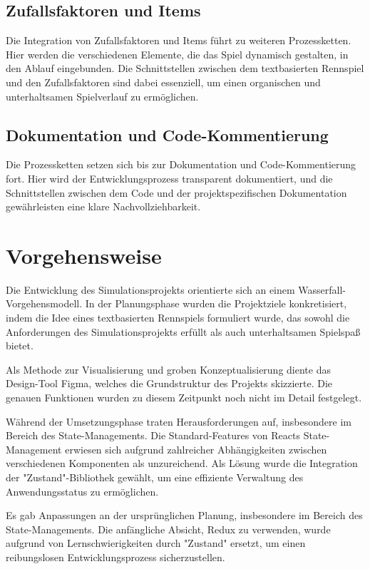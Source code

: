 \documentclass[hidelinks,12pt]{article}
\begin{document}
\subsection{Zufallsfaktoren und Items}
Die Integration von Zufallsfaktoren und Items führt zu weiteren Prozessketten. Hier werden die verschiedenen Elemente, die das Spiel dynamisch gestalten, in den Ablauf eingebunden. Die Schnittstellen zwischen dem textbasierten Rennspiel und den Zufallsfaktoren sind dabei essenziell, um einen organischen und unterhaltsamen Spielverlauf zu ermöglichen.

\subsection{Dokumentation und Code-Kommentierung}
Die Prozessketten setzen sich bis zur Dokumentation und Code-Kommentierung fort. Hier wird der Entwicklungsprozess transparent dokumentiert, und die Schnittstellen zwischen dem Code und der projektspezifischen Dokumentation gewährleisten eine klare Nachvollziehbarkeit.

\section{Vorgehensweise}
Die Entwicklung des Simulationsprojekts orientierte sich an einem Wasserfall-Vorgehensmodell. In der Planungsphase wurden die Projektziele konkretisiert, indem die Idee eines textbasierten Rennspiels formuliert wurde, das sowohl die Anforderungen des Simulationsprojekts erfüllt als auch unterhaltsamen Spielspaß bietet.

Als Methode zur Visualisierung und groben Konzeptualisierung diente das Design-Tool Figma, welches die Grundstruktur des Projekts skizzierte. Die genauen Funktionen wurden zu diesem Zeitpunkt noch nicht im Detail festgelegt.

Während der Umsetzungsphase traten Herausforderungen auf, insbesondere im Bereich des State-Managements. Die Standard-Features von Reacts State-Management erwiesen sich aufgrund zahlreicher Abhängigkeiten zwischen verschiedenen Komponenten als unzureichend. Als Lösung wurde die Integration der "Zustand"-Bibliothek gewählt, um eine effiziente Verwaltung des Anwendungsstatus zu ermöglichen.

Es gab Anpassungen an der ursprünglichen Planung, insbesondere im Bereich des State-Managements. Die anfängliche Absicht, Redux zu verwenden, wurde aufgrund von Lernschwierigkeiten durch "Zustand" ersetzt, um einen reibungslosen Entwicklungsprozess sicherzustellen.
\end{document}
